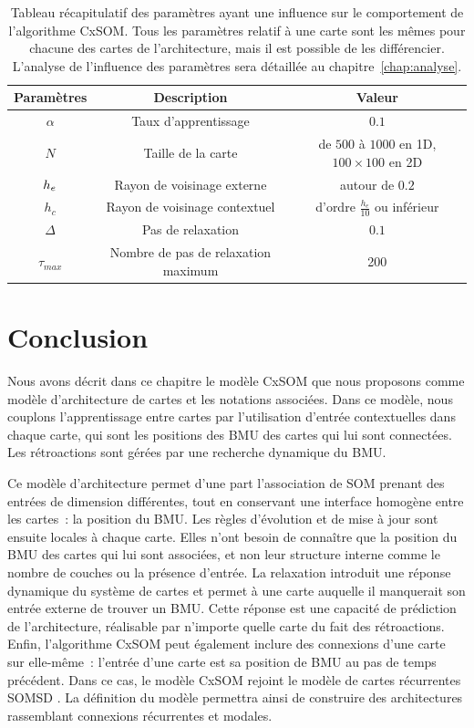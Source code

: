 \documentclass[../main]{subfiles}
\begin{document}
\begin{table}
\caption{Tableau récapitulatif des paramètres ayant une influence sur le comportement de l'algorithme CxSOM. Tous les paramètres relatif à une carte sont les mêmes pour chacune des cartes de l'architecture, mais il est possible de les différencier. L'analyse de l'influence des paramètres sera détaillée au chapitre~\ref{chap:analyse}.}\label{tab:params}
\vspace{3mm}
\begin{tabular}{|c|c|c|}
\hline
Paramètres & Description & Valeur \\
\hline
$\alpha$ & Taux d'apprentissage & $0.1$ \\
$N$ & Taille de la carte & de $500$ à $1000$ en 1D, $100 \times 100$ en 2D \\
$h_e$ & Rayon de voisinage externe & autour de $0.2$ \\
$h_c$ & Rayon de voisinage contextuel & d'ordre $\frac{h_e}{10}$ ou inférieur \\
$\Delta$ & Pas de relaxation & $0.1$ \\
$\tau_{max}$ & Nombre de pas de relaxation maximum & 200 \\
\hline
\end{tabular}
\end{table}


\section{Conclusion}

Nous avons décrit dans ce chapitre le modèle CxSOM que nous proposons comme modèle d'architecture de cartes et les notations associées.
Dans ce modèle, nous couplons l'apprentissage entre cartes par l'utilisation d'entrée contextuelles dans chaque carte, qui sont les positions des BMU des cartes qui lui sont connectées. Les rétroactions sont gérées par une recherche dynamique du BMU.

Ce modèle d'architecture permet d'une part l'association de SOM prenant des entrées de dimension différentes, tout en conservant une interface homogène entre les cartes~: la position du BMU.
Les règles d'évolution et de mise à jour sont ensuite locales à chaque carte. Elles n'ont besoin de connaître que la position du BMU des cartes qui lui sont associées, et non leur structure interne comme le nombre de couches ou la présence d'entrée. La relaxation introduit une réponse dynamique du système de cartes et permet à une carte auquelle il manquerait son entrée externe de trouver un BMU. Cette réponse est une capacité de prédiction de l'architecture, réalisable par n'importe quelle carte du fait des rétroactions.
Enfin, l'algorithme CxSOM peut également inclure des connexions d'une carte sur elle-même~: l'entrée d'une carte est sa position de BMU au pas de temps précédent. Dans ce cas, le modèle CxSOM rejoint le modèle de cartes récurrentes SOMSD \parencite{hammer_recursive_2004}. La définition du modèle permettra ainsi de construire des architectures rassemblant connexions récurrentes et modales.
\end{document}
